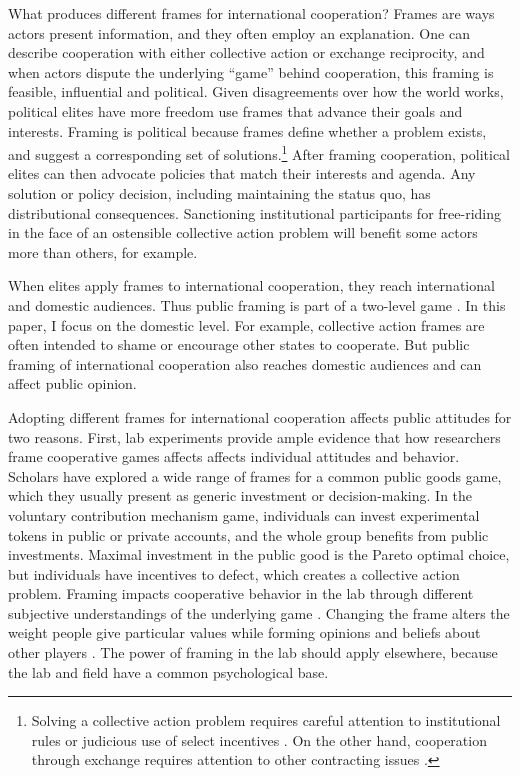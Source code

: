 \documentclass[12pt]{article}
\begin{document}
What produces different frames for international cooperation? 
Frames are ways actors present information, and they often employ an explanation. %
One can describe cooperation with either collective action or exchange reciprocity, and when actors dispute the underlying ``game'' behind cooperation, this framing is feasible, influential and political.  
Given disagreements over how the world works, political elites have more freedom use frames that advance their goals and interests. 
Framing is political because frames define whether a problem exists, and suggest a corresponding set of solutions.\footnote{Solving a collective action problem requires careful attention to institutional rules \citep{Ostrom1990} or judicious use of select incentives \citep{Olson1972, Hardin1982}.
On the other hand, cooperation through exchange requires attention to other contracting issues \citep{Williamson1985}.}  
After framing cooperation, political elites can then advocate policies that match their interests and agenda.
Any solution or policy decision, including maintaining the status quo, has distributional consequences. 
Sanctioning institutional participants for free-riding in the face of an ostensible collective action problem will benefit some actors more than others, for example.


When elites apply frames to international cooperation, they reach international and domestic audiences. 
Thus public framing is part of a two-level game \citep{Putnam1988}. 
In this paper, I focus on the domestic level. 
For example, collective action frames are often intended to shame or encourage other states to cooperate. 
But public framing of international cooperation also reaches domestic audiences and can affect public opinion. 


Adopting different frames for international cooperation affects public attitudes for two reasons. 
First, lab experiments provide ample evidence that how researchers frame cooperative games affects affects individual attitudes and behavior. 
Scholars have explored a wide range of frames for a common public goods game, which they usually present as generic investment or decision-making. 
In the voluntary contribution mechanism game, individuals can invest experimental tokens in public or private accounts, and the whole group benefits from public investments. 
Maximal investment in the public good is the Pareto optimal choice, but individuals have incentives to defect, which creates a collective action problem.
Framing impacts cooperative behavior in the lab through different subjective understandings of the underlying game \citep{Cookson2000, CartwrightRamalingam2019}. 
Changing the frame alters the weight people give particular values while forming opinions \citep{ChongDruckman2007} and beliefs about other players \citep{Dufwenbergetal2011}.
The power of framing in the lab should apply elsewhere, because the lab and field have a common psychological base. 
\end{document}
